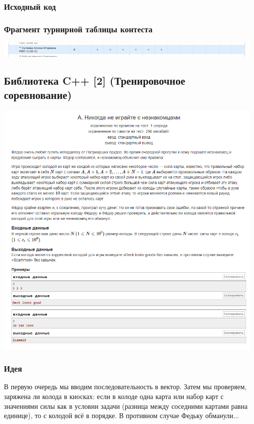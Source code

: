 \subsubsection*{Исходный код}



\subsubsection*{Фрагмент турнирной таблицы контеста}
\begin{center} 
\includegraphics[scale=0.5]{standings/3.png}\newline\noindent
\end{center} 
\pagebreak

\subsection*{Библиотека C++ [2] (Тренировочное соревнование)}
\begin{center} 
\includegraphics[scale=0.75]{statements/4_A.png}
\end{center} 
\subsubsection*{Идея}
В первую очередь мы вводим последовательность в вектор. Затем мы проверяем, заряжена ли колода в киосках: если в колоде одна карта или набор карт с значениями силы как в условии задачи (разница между соседними картами равна единице), то с колодой всё в порядке. В противном случае Федьку обманули...
